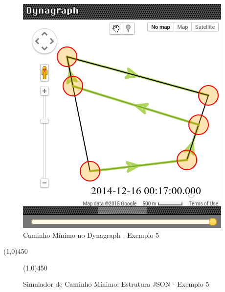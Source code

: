 \begin{figure}[htbp]
 \includegraphics[width=.35\textwidth]{chapters/fig/validacao/dyn5f.png}
\caption{Caminho Mínimo no Dynagraph - Exemplo 5}
\label{fig:dyn5}
\end{figure}
\FloatBarrier

\begin{center}
  \line(1,0){450}
\end{center}

\begin{figure}[htbp]
  \begin{center}
    \line(1,0){450}
  \end{center}
  \centering
  \caption{Simulador de Caminho Mínimo: Estrutura JSON - Exemplo 5}
  \label{fig:jsondyn5}
\end{figure}
\FloatBarrier